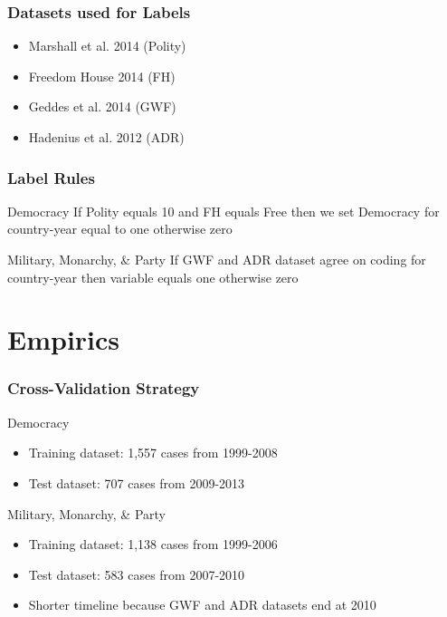 \documentclass{beamer}
\begin{document}
\begin{frame}
\frametitle{Datasets used for Labels}

\begin{itemize}
	\item Marshall et al. 2014 (Polity)
	\item Freedom House 2014 (FH)
	\item Geddes et al. 2014 (GWF)
	\item Hadenius et al. 2012 (ADR)
\end{itemize}

\end{frame}

\begin{frame}
\frametitle{Label Rules}

\begin{block}{Democracy}
If Polity equals 10 and FH equals Free then we set Democracy for country-year equal to one otherwise zero
\end{block}

\begin{block}{Military, Monarchy, \& Party}
If GWF and ADR dataset agree on coding for country-year then variable equals one otherwise zero
\end{block}

\end{frame}

\section{Empirics}

\begin{frame}
\frametitle{Cross-Validation Strategy}

\begin{block}{Democracy}
\begin{itemize}
	\item Training dataset: 1,557 cases from 1999-2008 
	\item Test dataset: 707 cases from 2009-2013
\end{itemize}
\end{block}

\begin{block}{Military, Monarchy, \& Party}
\begin{itemize}
	\item Training dataset: 1,138 cases from 1999-2006 
	\item Test dataset: 583 cases from 2007-2010
	\item Shorter timeline because GWF and ADR datasets end at 2010
\end{itemize}
\end{block}

\end{frame}
\end{document}

